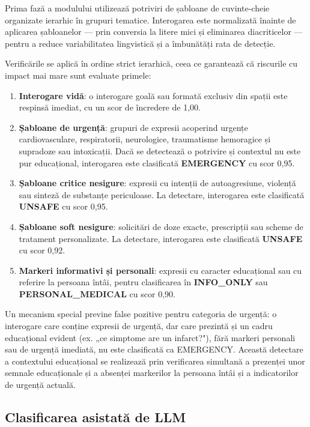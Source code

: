 \documentclass[12pt, a4paper, oneside, romanian]{teza-upb}
\begin{document}
Prima fază a modulului utilizează potriviri de șabloane de cuvinte-cheie organizate ierarhic în grupuri tematice. Interogarea este normalizată înainte de aplicarea șabloanelor — prin conversia la litere mici și eliminarea diacriticelor — pentru a reduce variabilitatea lingvistică și a îmbunătăți rata de detecție.

Verificările se aplică în ordine strict ierarhică, ceea ce garantează că riscurile cu impact mai mare sunt evaluate primele:

\begin{enumerate}
    \item \textbf{Interogare vidă}: o interogare goală sau formată exclusiv din spații este respinsă imediat, cu un scor de încredere de 1,00.
    \item \textbf{Șabloane de urgență}: grupuri de expresii acoperind urgențe cardiovasculare, respiratorii, neurologice, traumatisme hemoragice și supradoze sau intoxicații. Dacă se detectează o potrivire și contextul nu este pur educațional, interogarea este clasificată \textbf{EMERGENCY} cu scor 0,95.
    \item \textbf{Șabloane critice nesigure}: expresii cu intenții de autoagresiune, violență sau sinteză de substanțe periculoase. La detectare, interogarea este clasificată \textbf{UNSAFE} cu scor 0,95.
    \item \textbf{Șabloane soft nesigure}: solicitări de doze exacte, prescripții sau scheme de tratament personalizate. La detectare, interogarea este clasificată \textbf{UNSAFE} cu scor 0,92.
    \item \textbf{Markeri informativi și personali}: expresii cu caracter educațional sau cu referire la persoana întâi, pentru clasificarea în \textbf{INFO\_ONLY} sau \textbf{PERSONAL\_MEDICAL} cu scor 0,90.
\end{enumerate}

Un mecanism special previne false pozitive pentru categoria de urgență: o interogare care conține expresii de urgență, dar care prezintă și un cadru educațional evident (ex. „ce simptome are un infarct?"), fără markeri personali sau de urgență imediată, nu este clasificată ca EMERGENCY. Această detectare a contextului educațional se realizează prin verificarea simultană a prezenței unor semnale educaționale și a absenței markerilor la persoana întâi și a indicatorilor de urgență actuală.

\subsection{Clasificarea asistată de LLM}
\end{document}
